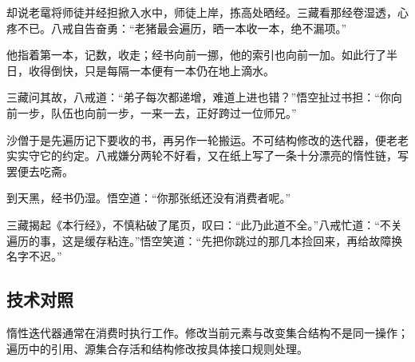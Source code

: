 却说老鼋将师徒并经担掀入水中，师徒上岸，拣高处晒经。三藏看那经卷湿透，心疼不已。八戒自告奋勇：“老猪最会遍历，晒一本收一本，绝不漏项。”

他指着第一本，记数，收走；经书向前一挪，他的索引也向前一加。如此行了半日，收得倒快，只是每隔一本便有一本仍在地上滴水。

三藏问其故，八戒道：“弟子每次都递增，难道上进也错？”悟空扯过书担：“你向前一步，队伍也向前一步，一来一去，正好跨过一位师兄。”

沙僧于是先遍历记下要收的书，再另作一轮搬运。不可结构修改的迭代器，便老老实实守它的约定。八戒嫌分两轮不好看，又在纸上写了一条十分漂亮的惰性链，写罢便去吃斋。

到天黑，经书仍湿。悟空道：“你那张纸还没有消费者呢。”

三藏揭起《本行经》，不慎粘破了尾页，叹曰：“此乃此道不全。”八戒忙道：“不关遍历的事，这是缓存粘连。”悟空笑道：“先把你跳过的那几本捡回来，再给故障换名字不迟。”

\subsection*{技术对照}

惰性迭代器通常在消费时执行工作。修改当前元素与改变集合结构不是同一操作；遍历中的引用、源集合存活和结构修改按具体接口规则处理。
